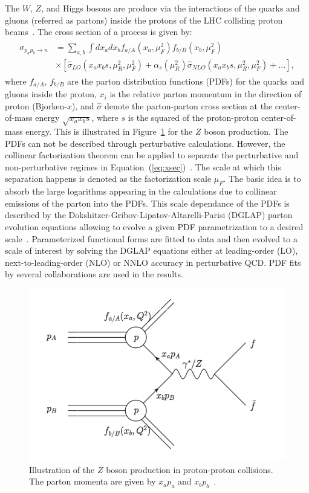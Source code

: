 The $W$, $Z$, and Higgs bosons are produce via the interactions of the quarks and gluons (referred as partons) inside the protons of the LHC colliding proton beams~\cite{Bloom:1969kc,Breidenbach:1969kd}. The cross section of a process is given by:
\begin{eqnarray} \label{eq:xsec}
\begin{aligned}
\sigma_{p_ap_b \rightarrow n} &= \sum_{a,b} \int dx_a dx_b f_{a/A}(x_a,\mu_{F}^2) f_{b/B}(x_{b},\mu_{F}^2)  \\ 
& \times [\hat{\sigma}_{LO}(x_ax_bs,\mu_R^2,\mu_F^2)+\alpha_s(\mu_R^2)\hat{\sigma}_{NLO}(x_ax_bs,\mu_R^2,\mu_F^2)+...],
\end{aligned}
\end{eqnarray}   
where $f_{a/A}$, $f_{b/B}$ are the parton distribution functions (PDFs) for the quarks and gluons inside the proton, $x_i$ is the relative parton momentum in the direction of proton (Bjorken-$x$), and $\hat{\sigma}$ denote the parton-parton cross section at the center-of-mass energy $\sqrt{x_{a}x_{b}s}$, where $s$ is the squared of the proton-proton center-of-mass energy.  This is illustrated in Figure~\ref{fig:lhc_collision} for the $Z$ boson production. The PDFs can not be described through perturbative calculations. However, the collinear factorization theorem can be applied to separate the perturbative and non-perturbative regimes in Equation~(\ref{eq:xsec})~\cite{Collins:1989gx}. The scale at which this separation happens is denoted as the factorization scale $\mu_{F}$. The basic idea is to absorb the large logarithms appearing in the calculations due to collinear emissions of the parton into the PDFs. This scale dependance of the PDFs is described by the Dokshitzer-Gribov-Lipatov-Altarelli-Parisi (DGLAP) parton evolution equations allowing to evolve a given PDF parametrization to a desired scale~\cite{Gribov:1972ri,Altarelli:1977zs,Dokshitzer:1977sg}. Parameterized functional forms are fitted to data and then evolved to a scale of interest by solving the DGLAP equations either at leading-order (LO), next-to-leading-order (NLO) or NNLO accuracy in perturbative QCD. PDF fits by several collaborations are used in the results.

\begin{figure}[h]
\centering
\includegraphics[width=0.60\columnwidth]{figures_chapter2/lhc_cross}
\caption{Illustration of the $Z$ boson production in proton-proton collisions. The parton momenta are given by $x_ap_a$ and $x_bp_b$~\cite{Schott:2014sea}.}
\label{fig:lhc_collision}
\end{figure} 

